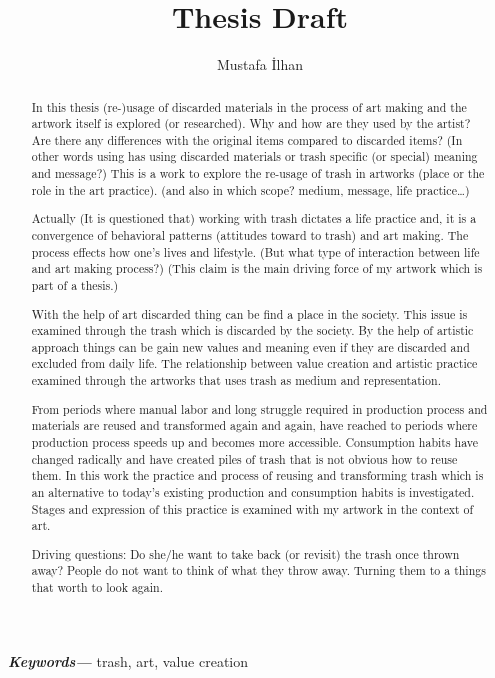 \documentclass[12pt]{article}
\title{Thesis Draft}
\author{Mustafa İlhan}
\providecommand{\keywords}[1]{\textbf{\textit{Keywords---}} #1}
\begin{document}
\maketitle

\begin{abstract}
In this thesis (re-)usage of discarded materials in the process of art making and the artwork itself is explored (or researched). Why and how are they used by the artist? Are there any differences with the original items compared to discarded items? (In other words using has using discarded materials or trash specific (or special) meaning and message?) This is a work to explore the re-usage of trash in artworks (place or the role in the art practice). (and also in which scope? medium, message, life practice\ldots) 

Actually (It is questioned that) working with trash dictates a life practice and, it is a convergence of behavioral patterns (attitudes toward to trash) and art making. The process effects how one's lives and lifestyle. (But what type of interaction between life and art making process?) (This claim is the main driving force of my artwork which is part of a thesis.)

With the help of art discarded thing can be find a place in the society. This issue is examined through the trash which is discarded by the society. By the help of artistic approach things can be gain new values and meaning even if they are discarded and excluded from daily life. The relationship between value creation and artistic practice examined through the artworks that uses trash as medium and representation.

From periods where manual labor and long struggle required in production process and materials are reused and transformed again and again, have reached to periods where production process speeds up and becomes more accessible. Consumption habits have changed radically and have created piles of trash that is not obvious how to reuse them. In this work the practice and process of reusing and transforming trash which is an alternative to today's existing production and consumption habits is investigated. Stages and expression of this practice is examined with my artwork in the context of art.

Driving questions: Do she/he want to take back (or revisit) the trash once thrown away? People do not want to think of what they throw away. Turning them to a things that worth to look again. 
\end{abstract}
\keywords{trash, art, value creation}
\end{document}
